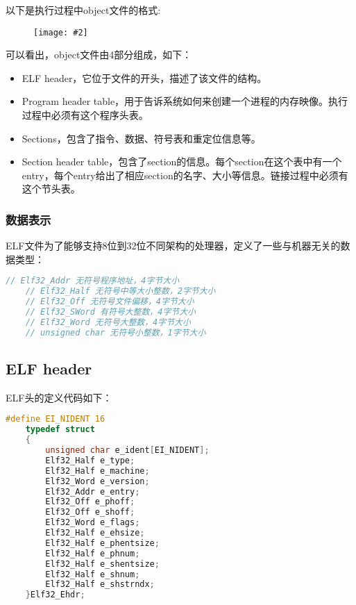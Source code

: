 \documentclass[a4paper,left=2.5cm,right=2.5cm,11pt]{article}
\newcommand{\sizedfic}[2]{\begin{figure}[H]
		\center
		\texttt{[image: \#2]}
	\end{figure}}
\begin{document}
	以下是执行过程中object文件的格式:
	\sizedfic{0.3}{8.png}

	可以看出，object文件由4部分组成，如下：
	\begin{itemize}
		\item ELF header，它位于文件的开头，描述了该文件的结构。
		\item Program header table，用于告诉系统如何来创建一个进程的内存映像。执行过程中必须有这个程序头表。
		\item Sections，包含了指令、数据、符号表和重定位信息等。
		\item Section header table，包含了section的信息。每个section在这个表中有一个entry，每个entry给出了相应section的名字、大小等信息。链接过程中必须有这个节头表。
	\end{itemize}

\subsubsection{数据表示}
	ELF文件为了能够支持8位到32位不同架构的处理器，定义了一些与机器无关的数据类型：
	\begin{lstlisting}[language = C]
	// Elf32_Addr 无符号程序地址，4字节大小
	// Elf32_Half 无符号中等大小整数，2字节大小
	// Elf32_Off 无符号文件偏移，4字节大小
	// Elf32_SWord 有符号大整数，4字节大小
	// Elf32_Word 无符号大整数，4字节大小
	// unsigned char 无符号小整数，1字节大小
	\end{lstlisting}


\subsection{ELF header}
	ELF头的定义代码如下：
	\begin{lstlisting}[language = C]
	#define EI_NIDENT 16
	typedef struct
	{
		unsigned char e_ident[EI_NIDENT];
		Elf32_Half e_type;
		Elf32_Half e_machine;
		Elf32_Word e_version;
		Elf32_Addr e_entry;
		Elf32_Off e_phoff;
		Elf32_Off e_shoff;
		Elf32_Word e_flags;
		Elf32_Half e_ehsize;
		Elf32_Half e_phentsize;
		Elf32_Half e_phnum;
		Elf32_Half e_shentsize;
		Elf32_Half e_shnum;
		Elf32_Half e_shstrndx;
	}Elf32_Ehdr;
	\end{lstlisting}
\end{document}
